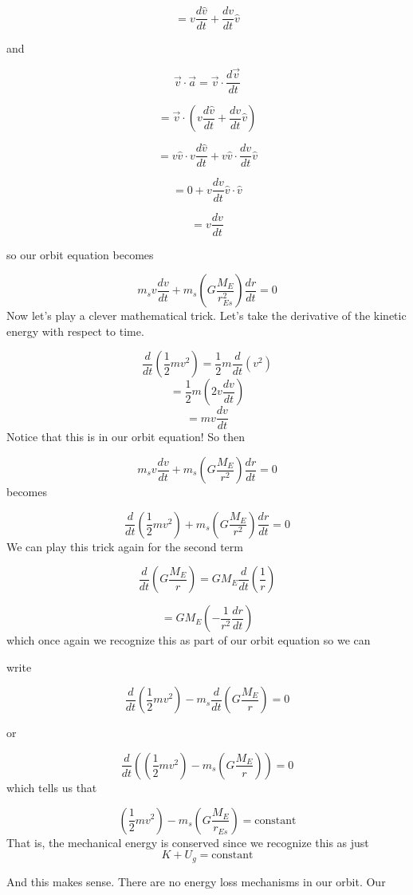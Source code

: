 $$=v\frac{d\hat{v}}{dt}+\frac{dv}{dt}\hat{v}$$

and 

$$\overrightarrow{v}\cdot \overrightarrow{a}=\overrightarrow{v}\cdot \frac{d\overrightarrow{v}}{dt}$$

$$=\overrightarrow{v}\cdot \left( v\frac{d\hat{v}}{dt}+\frac{dv}{dt}\hat{v}\right)
$$

$$=v\hat{v}\cdot v\frac{d\hat{v}}{dt}+v\hat{v}\cdot \frac{dv}{dt}\hat{v}$$

$$=0+v\frac{dv}{dt}\hat{v}\cdot \hat{v}$$

$$=v\frac{dv}{dt}$$

so our orbit equation becomes

$$m_{s}v\frac{dv}{dt}+m_{s}\left( G\frac{M_{E}}{r_{Es}^{2}}\right) \frac{dr}{dt}=0
$$
Now let's play a clever mathematical trick. Let's take the derivative of the
kinetic energy with respect to time.

$$\frac{d}{dt}\left( \frac{1}{2}mv^{2}\right) =\frac{1}{2}m\frac{d}{dt}\left(v^{2}\right) 
$$%
$$=\frac{1}{2}m\left( 2v\frac{dv}{dt}\right) 
$$%
$$=mv\frac{dv}{dt}$$%
Notice that this is in our orbit equation! So then%

$$m_{s}v\frac{dv}{dt}+m_{s}\left( G\frac{M_{E}}{r^{2}}\right) \frac{dr}{dt}=0
$$%
becomes 

$$\frac{d}{dt}\left( \frac{1}{2}mv^{2}\right) +m_{s}\left( G\frac{M_{E}}{r^{2}}\right) \frac{dr}{dt}=0$$%
We can play this trick again for the second term%

$$
\frac{d}{dt}\left( G\frac{M_{E}}{r}\right) =GM_{E}\frac{d}{dt}\left( \frac{1}{r}\right) 
$$
	
$$
=GM_{E}\left( -\frac{1}{r^{2}}\frac{dr}{dt}\right) 
$$
which once again we recognize this as part of our orbit equation so we can

write 

$$\frac{d}{dt}\left( \frac{1}{2}mv^{2}\right) -m_{s}\frac{d}{dt}\left( G\frac{M_{E}}{r}\right) =0$$

or 

$$\frac{d}{dt}\left( \left( \frac{1}{2}mv^{2}\right) -m_{s}\left( G\frac{M_{E}}{r}\right) \right) =0 
$$%
which tells us that 

$$
\left( \frac{1}{2}mv^{2}\right) -m_{s}\left( G\frac{M_{E}}{r_{Es}}\right) =\text{constant} 
$$
That is, the mechanical energy is conserved since we recognize this as just 
$$K+U_{g}=\text{constant} $$

And this makes sense. There are no energy loss mechanisms in our orbit. Our

